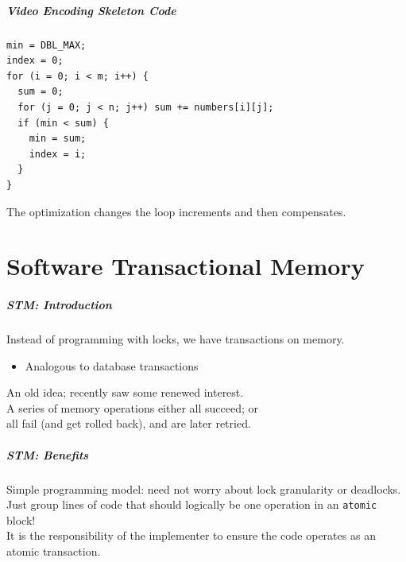 
\begin{frame}[fragile]
  \frametitle{Video Encoding Skeleton Code}


\begin{lstlisting}
min = DBL_MAX;
index = 0;
for (i = 0; i < m; i++) {
  sum = 0;
  for (j = 0; j < n; j++) sum += numbers[i][j];
  if (min < sum) {
    min = sum;
    index = i;
  }
}
\end{lstlisting}
The optimization changes the loop increments and then compensates. 

\end{frame}


\part{Software Transactional Memory}
\frame{\partpage}

\begin{frame}
  \frametitle{STM: Introduction}


    Instead of programming with locks, we have transactions on memory.
      \begin{itemize}
        \item Analogous to database transactions
      \end{itemize}
    An old idea; recently saw some renewed interest.\\[1em]

    A series of memory operations either all succeed; or \\ \qquad
     all fail (and get
      rolled back), and are later retried.

\end{frame}

\begin{frame}
  \frametitle{STM: Benefits}


    Simple programming model: need not worry about lock
      granularity or deadlocks.\\[1em]

    Just group lines of code that should logically be one operation
      in an {\tt atomic} block!\\[1em]

    It is the responsibility of the implementer to ensure the code
      operates as an atomic transaction.

\end{frame}

